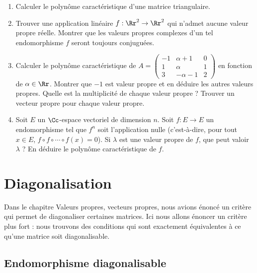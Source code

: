 \documentclass[12pt, class=report,crop=false]{standalone}
\begin{document}
\begin{miniexercices}
\sauteligne
\begin{enumerate}
  \item Calculer le polynôme caractéristique d'une matrice triangulaire.

  \item Trouver une application linéaire $f : \Rr^2 \to \Rr^2$ qui n'admet aucune valeur propre réelle. Montrer que les valeurs propres complexes d'un tel endomorphisme $f$ seront toujours conjuguées.
  
  \item Calculer le polynôme caractéristique de $A
  = \left(\begin{smallmatrix}
  -1 & \alpha + 1 & 0 \\
1 & \alpha & 1 \\
3 & - \alpha - 1 & 2
\end{smallmatrix}\right)$ en fonction de $\alpha \in \Rr$. Montrer que $-1$ est valeur propre et en déduire les autres valeurs propres.
Quelle est la multiplicité de chaque valeur propre ? Trouver un vecteur propre pour chaque valeur propre.
  
  \item Soit $E$ un $\Cc$-espace vectoriel de dimension $n$. 
  Soit $f : E \to E$ un endomorphisme tel que $f^n$ soit l'application nulle (c'est-à-dire, pour tout $x\in E$, $f\circ f \circ \cdots \circ f(x) = 0$). Si $\lambda$ est une valeur propre de $f$, que peut valoir $\lambda$ ? En déduire le polynôme caractéristique de $f$.
  
\end{enumerate}
\end{miniexercices}



\section{Diagonalisation}


Dans le chapitre \og{}Valeurs propres, vecteurs propres\fg{},
nous avions énoncé un critère qui permet de diagonaliser certaines matrices.
Ici nous allons énoncer un critère plus fort : nous trouvons des conditions qui sont exactement équivalentes à ce qu'une matrice soit diagonalisable.


\subsection{Endomorphisme diagonalisable}
\end{document}

